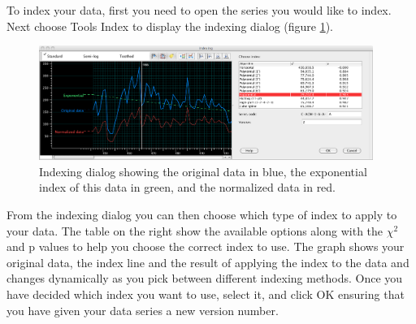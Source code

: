 To index your data, first you need to open the series you would like to index.  Next choose Tools \MVRightarrow Index to display the indexing dialog (figure \ref{fig:index}).

\begin{figure}[hbtp]
  \centering
    \includegraphics[width=0.97\textwidth]{Images/index.png}
    \caption{Indexing dialog showing the original data in blue, the exponential index of this data in green, and the normalized data in red. }
    \label{fig:index}
\end{figure}

From the indexing dialog you can then choose which type of index to apply to your data.  The table on the right show the available options along with the $\chi^2$ and p values to help you choose the correct index to use. The graph shows your original data, the index line and the result of applying the index to the data and changes dynamically as you pick between different indexing methods. Once you have decided which index you want to use, select it, and click OK ensuring that you have given your data series a new version number.

